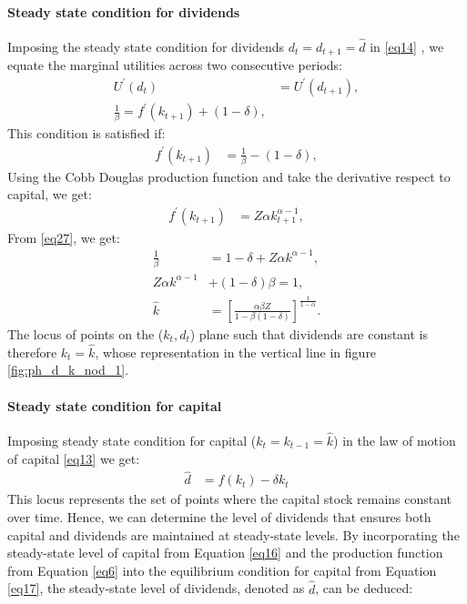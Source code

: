 \documentclass[12pt]{report}
\begin{document}
\paragraph{Steady state condition for dividends}
Imposing the steady state condition for dividends \( d_t = d_{t+1} = \widehat{d} \) in \ref{eq14} , we
equate the marginal  utilities across two consecutive periods:
\begin{align}
    U^{\prime}(d_t) &= U^{\prime}(d_{t+1}), \nonumber \\
    \frac{1}{\beta} = f^{\prime}(k_{t+1}) + (1-\delta),\label{eq27}
\end{align}
This condition is satisfied if:
\begin{align}
    f^{\prime}(k_{t+1}) &= \frac{1}{\beta} - (1-\delta), 
\end{align}
Using the Cobb Douglas production function and take the derivative respect to capital, we get:
\begin{align}
    f^{\prime}(k_{t+1}) &= Z \alpha k^{\alpha-1}_{t+1},  \label{eq15'}
\end{align}
From \ref{eq27}, we get: 
\begin{align}
    \frac{1}{\beta}&=1-\delta+Z\alpha k^{\alpha-1},\nonumber \\
    Z\alpha k^{\alpha-1} &+(1-\delta)\beta=1, \nonumber \\
    \widehat{k} &= \left[\frac{\alpha \beta Z}{1 - \beta\left(1-\delta\right)}\right]^{\frac{1}{1-\alpha}}.  \label{eq16}
\end{align}
The locus of points on the (\(k_t,d_t\)) plane such that dividends are constant is therefore
\(k_t=\hat{k}\), whose representation in the vertical line in figure \ref{fig:ph_d_k_nod_1}.
\paragraph{Steady state condition for capital}
Imposing steady state condition for capital (\(k_t = k_{t-1} = \widehat{k}\)) in the law of motion of capital \ref{eq13} we
get:
\begin{align}
    \widehat{d} & = f(k_t) - \delta k_t  \label{eq17}
\end{align}
This locus represents the set of points where the capital stock remains constant over time. Hence, we can determine the
level of dividends that ensures both capital and dividends are maintained at steady-state levels. By incorporating the
steady-state level of capital  from Equation \ref{eq16} and the production function from Equation \ref{eq6} into the equilibrium
condition for capital from Equation \ref{eq17}, the steady-state level of dividends, denoted as \( \widehat{d} \), can be
deduced:
\end{document}
